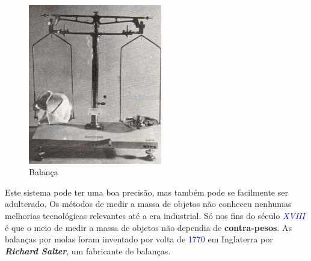 \hspace{2.2cm}
\begin{minipage}[!b]{0.45\linewidth}
	\begin{figure}[H]
		\centering
		\includegraphics[height=7cm]{./image/PESTA/general/balanca_4.jpg}
		\caption{Balança}
		\label{balanca_4}
	\end{figure}
\end{minipage}
\newline
\newline
\newline
Este sistema pode ter uma boa precisão, mas também pode se facilmente ser adulterado.
\newpage
Os métodos de medir a massa de objetos não conheceu nenhumas melhorias tecnológicas relevantes até a era industrial. Só nos fins do século \textcolor{blue}{\textit{XVIII}} é que o meio de medir a massa de objetos não dependia de \textbf{contra-pesos}. As balanças por molas foram inventado por volta de \textcolor{blue}{1770} em Inglaterra por \textbf{\textit{Richard Salter}}, um fabricante de balanças.
\\
